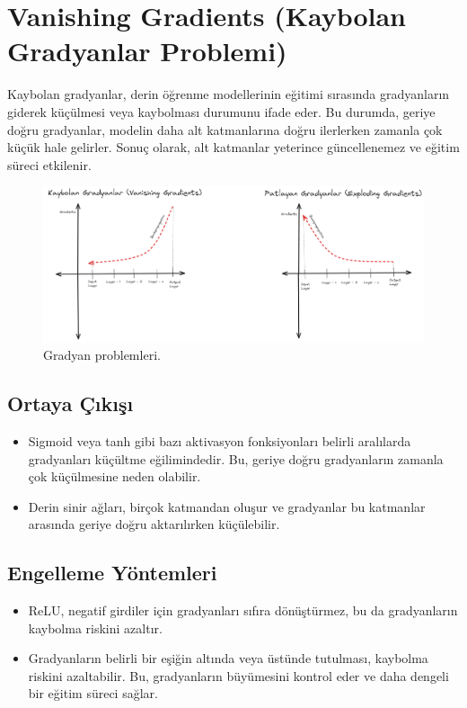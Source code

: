 \section{Vanishing Gradients (Kaybolan Gradyanlar Problemi)}
Kaybolan gradyanlar, derin öğrenme modellerinin eğitimi sırasında gradyanların giderek küçülmesi veya kaybolması durumunu ifade eder. Bu durumda, geriye doğru gradyanlar, modelin daha alt katmanlarına doğru ilerlerken zamanla çok küçük hale gelirler. Sonuç olarak, alt katmanlar yeterince güncellenemez ve eğitim süreci etkilenir.

\begin{figure}[h]
    \centering
    \includegraphics[width=1\textwidth]{images/gradient_problems.png}
    \caption{Gradyan problemleri.}
    \label{fig:enter-label}
\end{figure}

\subsection{Ortaya Çıkışı}
\begin{itemize}
    \item Sigmoid veya tanh gibi bazı aktivasyon fonksiyonları belirli aralılarda gradyanları küçültme eğilimindedir. Bu, geriye doğru gradyanların zamanla çok küçülmesine neden olabilir.
    \item Derin sinir ağları, birçok katmandan oluşur ve gradyanlar bu katmanlar arasında geriye doğru aktarılırken küçülebilir.
\end{itemize}

\subsection{Engelleme Yöntemleri}
\begin{itemize}
    \item ReLU, negatif girdiler için gradyanları sıfıra dönüştürmez, bu da gradyanların kaybolma riskini azaltır.
    \item Gradyanların belirli bir eşiğin altında veya üstünde tutulması, kaybolma riskini azaltabilir. Bu, gradyanların büyümesini kontrol eder ve daha dengeli bir eğitim süreci sağlar.
\end{itemize}

\newpage